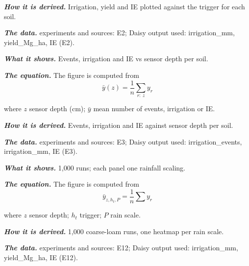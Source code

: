 \par\noindent\textbf{\color{khmag}\emph{How it is derived.}} Irrigation, yield and IE plotted against the trigger for each soil.
\par\noindent\textbf{\color{khmag}\emph{The data.}} experiments and sources: E2; Daisy output used: irrigation\_mm, yield\_Mg\_ha, IE (E2).
\par\vspace{6pt}\noindent{}\par\nobreak
{}\label{fig:a20_7}
\par\noindent\textbf{\color{khmag}\emph{What it shows.}} Events, irrigation and IE vs sensor depth per soil.
\par\noindent\textbf{\color{khmag}\emph{The equation.}} The figure is computed from
\begin{equation}\boxed{\bar y(z)=\dfrac1n\sum_{r:\ z} y_r}\end{equation}
\par\noindent where $z$ sensor depth (cm); $\bar y$ mean number of events, irrigation or IE.
\par\noindent\textbf{\color{khmag}\emph{How it is derived.}} Events, irrigation and IE against sensor depth per soil.
\par\noindent\textbf{\color{khmag}\emph{The data.}} experiments and sources: E3; Daisy output used: irrigation\_events, irrigation\_mm, IE (E3).
\par\vspace{6pt}\noindent{}\par\nobreak
{}\label{fig:a20_8}
\par\noindent\textbf{\color{khmag}\emph{What it shows.}} 1,000 runs; each panel one rainfall scaling.
\par\noindent\textbf{\color{khmag}\emph{The equation.}} The figure is computed from
\begin{equation}\boxed{\bar y_{z,h_t,P}=\dfrac1n\sum y_r}\end{equation}
\par\noindent where $z$ sensor depth; $h_t$ trigger; $P$ rain scale.
\par\noindent\textbf{\color{khmag}\emph{How it is derived.}} 1,000 coarse-loam runs, one heatmap per rain scale.
\par\noindent\textbf{\color{khmag}\emph{The data.}} experiments and sources: E12; Daisy output used: irrigation\_mm, yield\_Mg\_ha, IE (E12).
